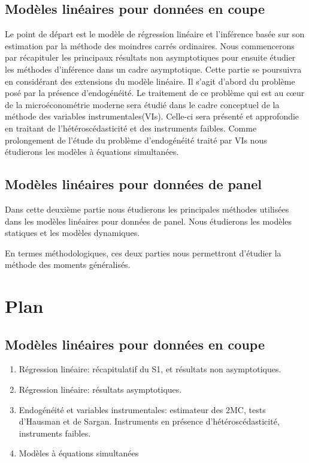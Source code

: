 \documentclass[10pt, reqno]{amsart}
\begin{document}
 \subsection{Modèles linéaires pour données en coupe}

 Le point de départ est le modèle de régression linéaire et l'inférence basée sur son estimation 
 par la méthode des moindres carrés ordinaires. Nous commencerons par récapituler 
 les principaux résultats non asymptotiques pour ensuite étudier 
 les méthodes d'inférence dans un cadre asymptotique. Cette partie se poursuivra en considérant des extensions 
du modèle linéaire. Il s'agit d'abord du problème posé par la présence d'endogénéité. 
Le traitement de ce problème qui est au cœur de la microéconométrie moderne sera étudié 
dans le cadre conceptuel de la méthode des variables instrumentales(VIs). 
Celle-ci sera présenté et approfondie en traitant de l'hétéroscédasticité  et des instruments faibles. 
Comme prolongement de l'étude du problème d'endogénéité traité par VIs nous étudierons les modèles à équations simultanées.


\subsection{Modèles linéaires pour données de panel}

Dans cette deuxième partie nous étudierons les principales méthodes utilisées dans les modèles linéaires 
pour données de panel. Nous étudierons les modèles statiques et les modèles dynamiques.

En termes méthodologiques, ces deux parties nous permettront d'étudier la méthode des moments généralisés.


\section{Plan}
 
\subsection{Modèles linéaires pour données en coupe}
\begin{enumerate}
 \item Régression linéaire:  récapitulatif du S1, et résultats non asymptotiques.
 \item Régression linéaire: résultats asymptotiques.
 \item Endogénéité et variables instrumentales: estimateur des 2MC, tests d'Hausman et de Sargan.
Instruments en présence d'hétéroscédasticité, instruments faibles.
\item Modèles à équations simultanées
\end{enumerate}
\end{document}
